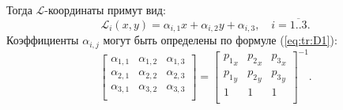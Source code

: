 \documentclass[a4paper,14pt]{article}
\begin{document}
\noindent Тогда $\mathcal{L}$-координаты примут вид:
\begin{equation*}
	\mathcal{L}_i (x, y) = \alpha_{i, 1} x + \alpha_{i, 2} y + \alpha_{i, 3} , \text{~~~} i = \overline{1..3} . \label{eq:tr:L}
\end{equation*}
Коэффициенты $\alpha_{i, j}$ могут быть определены по формуле (\ref{eq:tr:D1}):
\begin{equation}
	\left[
	\begin{matrix}
		\alpha_{1, 1} & \alpha_{1, 2} & \alpha_{1, 3} \\
		\alpha_{2, 1} & \alpha_{2, 2} & \alpha_{2, 3} \\
		\alpha_{3, 1} & \alpha_{3, 2} & \alpha_{3, 3} \\
	\end{matrix}
	\right] = \left[
	\begin{matrix}
		{p_1}_x & {p_2}_x & {p_3}_x \\
		{p_1}_y & {p_2}_y & {p_3}_y \\
		1 & 1 & 1 \\
	\end{matrix}
	\right]^{-1} . \label{eq:tr:D1}
\end{equation}
\end{document}
